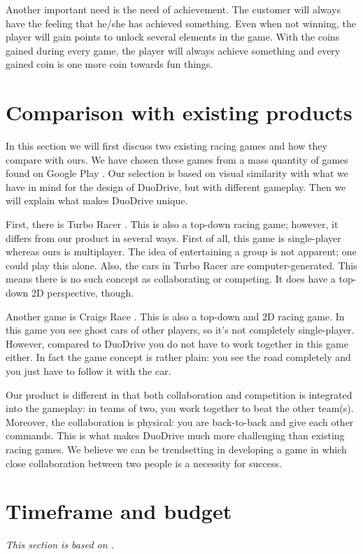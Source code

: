 \documentclass[12pt,twoside,a4paper]{article}
\begin{document}
Another important need is the need of achievement. The customer will always have the feeling that he/she has achieved something. Even when not winning, the player will gain points to unlock several elements in the game. With the coins gained during every game, the player will always achieve something and every gained coin is one more coin towards fun things.


\section{Comparison with existing products}
In this section we will first discuss two existing racing games and how they compare with ours. We have chosen these games from a mass quantity of games found on Google Play \cite{googleplay}. Our selection is based on visual similarity with what we have in mind for the design of DuoDrive, but with different gameplay. Then we will explain what makes DuoDrive unique.

First, there is Turbo Racer \cite{turboracer}. This is also a top-down racing game; however, it differs from our product in several ways. First of all, this game is single-player whereas ours is multiplayer. The idea of entertaining a group is not apparent; one could play this alone. Also, the cars in Turbo Racer are computer-generated. This means there is no such concept as collaborating or competing. It does have a top-down 2D perspective, though.

Another game is Craigs Race \cite{craigsrace1} \cite{craigsrace2}. This is also a top-down and 2D racing game. In this game you see ghost cars of other players, so it's not completely single-player. However, compared to DuoDrive you do not have to work together in this game either. In fact the game concept is rather plain: you see the road completely and you just have to follow it with the car.

Our product is different in that both collaboration and competition is integrated into the gameplay: in teams of two, you work together to beat the other team(s). Moreover, the collaboration is physical: you are back-to-back and give each other commands. This is what makes DuoDrive much more challenging than existing racing games. We believe we can be trendsetting in developing a game in which close collaboration between two people is a necessity for success.


\section{Timeframe and budget}
{\itshape This section is based on \cite{gamesplanning}.}
\end{document}
